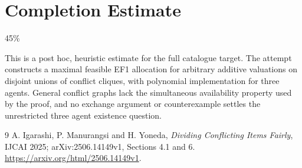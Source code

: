\documentclass[11pt]{article}
\theoremstyle{remark}
\begin{document}
\section{Completion Estimate}
45\%

This is a post hoc, heuristic estimate for the full catalogue target.
The attempt constructs a maximal feasible EF1 allocation for arbitrary additive valuations on disjoint unions of conflict cliques, with polynomial implementation for three agents. General conflict graphs lack the simultaneous availability property used by the proof, and no exchange argument or counterexample settles the unrestricted three agent existence question.

\begin{thebibliography}{9}
 A. Igarashi, P. Manurangsi and H. Yoneda, \emph{Dividing Conflicting Items Fairly}, IJCAI 2025; arXiv:2506.14149v1, Sections 4.1 and 6. \url{https://arxiv.org/html/2506.14149v1}.
\end{thebibliography}
\end{document}
